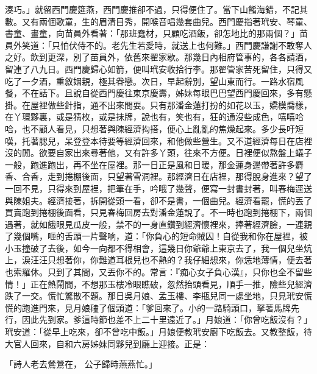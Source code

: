 \begin{showcontents}{}
湊巧。」就留西門慶筵燕，西門慶推卻不過，只得便住了。當下山餚海錯，不記其數。又有兩個歌童，生的眉清目秀，開喉音唱幾套曲兒。西門慶指著玳安、琴童、書童、畫童，向苗員外看著：「那班蠢材，只顧吃酒飯，卻怎地比的那兩個？」苗員外笑道：「只怕伏侍不的。老先生若愛時，就送上也何難。」西門慶謙謝不敢奪人之好。飲到更深，別了苗員外，依舊來翟家歇。那幾日內相府管事的，各各請酒，留連了八九日。西門慶歸心如箭，便叫玳安收拾行李。那翟管家苦死留住，只得又吃了一夕酒，重敘姻親，極其眷戀。次日，早起辭別，望山東而行。一路水宿風餐，不在話下。且說自從西門慶往東京慶壽，姊妹每眼巴巴望西門慶回來，多有懸掛。在屋裡做些針指，通不出來間耍。只有那潘金蓮打扮的如花以玉，嬌模喬樣，在丫環夥裏，或是猜枚，或是抹牌，說也有，笑也有，狂的通沒些成色，嘻嘻哈哈，也不顧人看見，只想著與陳經濟抅搭，便心上亂亂的焦燥起來。多少長吁短嘆，托著腮兒，呆登登本待要等經濟回來，和他做些營生。又不道經濟每日在店裡沒的閒。欲要自家出來尋著他，又有許多丫頭，往來不方便。日裡便似熬盤上蟻子一般，跑進跑出，再不坐在屋裡。那一日正是風和日暖，那金蓮身邊帶著許多麝香、合香，走到捲棚後面，只望著雪洞裡。那經濟日在店裡，那得脫身進來？望了一回不見，只得來到屋裡，把筆在手，吟哦了幾聲，便寫一封書封著，叫春梅逕送與陳姐夫。經濟接著，拆開從頭一看，卻不是書，一個曲兒。經濟看罷，慌的丟了買賣跑到捲棚後面看，只見春梅回房去對潘金蓮說了。不一時也跑到捲棚下，兩個遇著，就如餓眼見瓜皮一般，禁不的一身直鑽到經濟懷裡來，捧著經濟臉，一連親了幾個嘴，咂的舌頭一片聲响，道：「你負心的短命賊囚！自從我和你在屋裡，被小玉撞破了去後，如今一向都不得相會，這幾日你爺爺上東京去了，我一個兒坐炕上，淚汪汪只想著你，你難道耳根兒也不熱的？我仔細想來，你恁地薄情，便去著也索羅休。只到了其間，又丟你不的。常言：『痴心女子負心漢』，只你也全不留些情！」正在熱鬧間，不想那玉樓冷眼瞧破，忽然抬頭看見，順手一推，險些兒經濟跌了一交。慌忙驚散不題。那日吳月娘、孟玉樓、李瓶兒同一處坐地，只見玳安慌慌的跑進門來，見月娘磕了個頭道：「爹回來了。小的一路騎頭口，拏著馬牌先行，因此先到家。爹這時節也差不上二十里遠近了。」月娘道：「你曾吃飯沒有？」玳安道：「從早上吃來，卻不曾吃中飯。」月娘便教玳安廚下吃飯去。又教整飯，待大官人回來，自和六房姊妹同夥兒到廳上迎接。正是：

「詩人老去鶯鶯在，  公子歸時燕燕忙。」


\end{showcontents}
